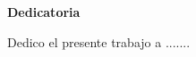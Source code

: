 \null \vfil \vfil

\begin{center}
\textbf{Dedicatoria}
\end{center}
\vspace{0.5cm}
Dedico el presente trabajo a .......

\vfil \null
\newpage 
